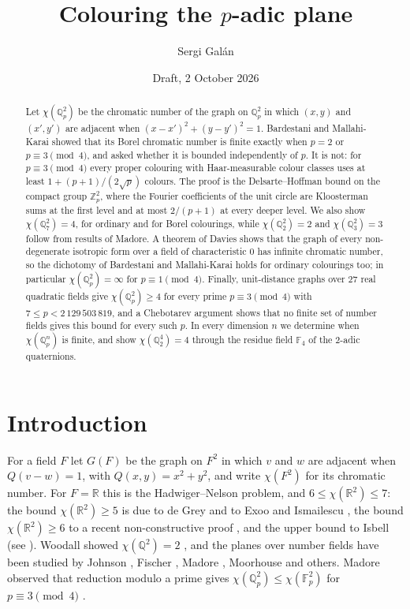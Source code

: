 \documentclass[11pt,a4paper]{amsart}
\title{Colouring the $p$-adic plane}
\author{Sergi Gal\'an}
\date{Draft, 2 October 2026}
\theoremstyle{remark}
\newcommand{\F}{\mathbb{F}}
\newcommand{\Q}{\mathbb{Q}}
\newcommand{\R}{\mathbb{R}}
\newcommand{\Z}{\mathbb{Z}}
\begin{document}
\begin{abstract}
Let $\chi(\Q_p^2)$ be the chromatic number of the graph on $\Q_p^2$ in which $(x,y)$ and $(x',y')$ are adjacent
when $(x-x')^2+(y-y')^2=1$. Bardestani and Mallahi-Karai showed that its Borel chromatic number is finite
exactly when $p=2$ or $p\equiv 3\pmod 4$, and asked whether it is bounded independently of $p$. It is not: for
$p\equiv3\pmod4$ every proper colouring with Haar-measurable colour classes uses at least
$1+(p+1)/(2\sqrt p)$ colours. The proof is the Delsarte--Hoffman bound on the compact group $\Z_p^2$, where the
Fourier coefficients of the unit circle are Kloosterman sums at the first level and at most $2/(p+1)$ at every
deeper level. We also show $\chi(\Q_7^2)=4$, for ordinary and for Borel colourings, while $\chi(\Q_2^2)=2$ and
$\chi(\Q_3^2)=3$ follow from results of Madore. A theorem of Davies shows that the graph of every non-degenerate
isotropic form over a field of characteristic $0$ has infinite chromatic number, so the dichotomy of Bardestani and
Mallahi-Karai holds for ordinary colourings too; in particular $\chi(\Q_p^2)=\infty$ for $p\equiv1\pmod4$. Finally,
unit-distance graphs over $27$ real quadratic fields give $\chi(\Q_p^2)\ge4$ for every prime $p\equiv3\pmod4$ with
$7\le p<2\,129\,503\,819$, and a Chebotarev argument shows that no finite set of number fields gives this bound
for every such $p$. In every dimension $n$ we determine when $\chi(\Q_p^n)$ is finite, and show
$\chi(\Q_2^4)=4$ through the residue field $\F_4$ of the $2$-adic quaternions.
\end{abstract}

\maketitle

\section{Introduction}

For a field $F$ let $G(F)$ be the graph on $F^2$ in which $v$ and $w$ are adjacent when $Q(v-w)=1$, with
$Q(x,y)=x^2+y^2$, and write $\chi(F^2)$ for its chromatic number. For $F=\R$ this is the Hadwiger--Nelson
problem, and $6\le\chi(\R^2)\le7$: the bound $\chi(\R^2)\ge5$ is due to de Grey \cite{deGrey} and to Exoo and Ismailescu
\cite{EI}, the bound $\chi(\R^2)\ge6$ to a recent non-constructive proof \cite{OpenAI}, and the upper bound to
Isbell (see \cite{Soifer}). Woodall showed $\chi(\Q^2)=2$ \cite{Woodall}, and the
planes over number fields have been studied by Johnson \cite{Johnson1987}, Fischer \cite{Fischer1990}, Madore
\cite{Madore}, Moorhouse \cite{Moorhouse} and others. Madore observed that reduction modulo a prime gives
$\chi(\Q_p^2)\le\chi(\F_p^2)$ for $p\equiv3\pmod4$ \cite[\P1.5 and Remark~3.6]{Madore}.
\end{document}
